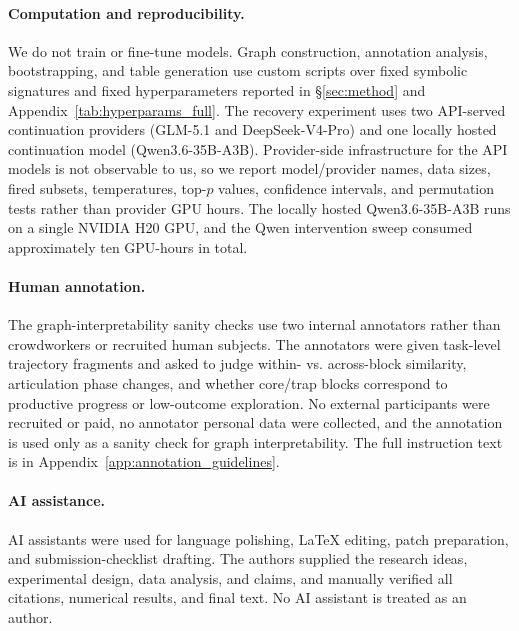 \paragraph{Computation and reproducibility.}
We do not train or fine-tune models.
Graph construction, annotation analysis, bootstrapping, and table generation use custom scripts over fixed symbolic signatures and fixed hyperparameters reported in \S\ref{sec:method} and Appendix~\ref{tab:hyperparams_full}.
The recovery experiment uses two API-served continuation providers (GLM-5.1 and DeepSeek-V4-Pro) and one locally hosted continuation model (Qwen3.6-35B-A3B).
Provider-side infrastructure for the API models is not observable to us, so we report model/provider names, data sizes, fired subsets, temperatures, top-$p$ values, confidence intervals, and permutation tests rather than provider GPU hours.
The locally hosted Qwen3.6-35B-A3B runs on a single NVIDIA H20 GPU, and the Qwen intervention sweep consumed approximately ten GPU-hours in total.

\paragraph{Human annotation.}
The graph-interpretability sanity checks use two internal annotators rather than crowdworkers or recruited human subjects.
The annotators were given task-level trajectory fragments and asked to judge within- vs. across-block similarity, articulation phase changes, and whether core/trap blocks correspond to productive progress or low-outcome exploration.
No external participants were recruited or paid, no annotator personal data were collected, and the annotation is used only as a sanity check for graph interpretability.
The full instruction text is in Appendix~\ref{app:annotation_guidelines}.

\paragraph{AI assistance.}
AI assistants were used for language polishing, LaTeX editing, patch preparation, and submission-checklist drafting.
The authors supplied the research ideas, experimental design, data analysis, and claims, and manually verified all citations, numerical results, and final text.
No AI assistant is treated as an author.
